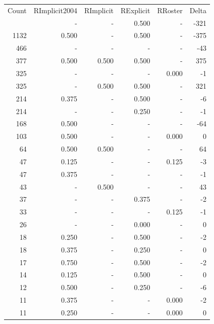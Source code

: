 \documentclass[a4paper]{article}\usepackage{graphicx, color}
\begin{document}
\begin{table}[ht]
\centering
\begin{tabular}{rrrrrr}
  \hline
Count & RImplicit2004 & RImplicit & RExplicit & RRoster & Delta \\ 
  \rowcolor{sosoColor}  \hline
1472 & - & - & 0.500 & - & -321 \\ 
   \rowcolor{sosoColor} 1132 & 0.500 & - & 0.500 & - & -375 \\ 
   \rowcolor{nullColor} 466 & - & - & - & - & -43 \\ 
   \rowcolor{goodColor} 377 & 0.500 & 0.500 & 0.500 & - & 375 \\ 
   \rowcolor{nullColor} 325 & - & - & - & 0.000 & -1 \\ 
   \rowcolor{goodColor} 325 & - & 0.500 & 0.500 & - & 321 \\ 
   \rowcolor{sosoColor} 214 & 0.375 & - & 0.500 & - & -6 \\ 
   \rowcolor{sosoColor} 214 & - & - & 0.250 & - & -1 \\ 
   \rowcolor{nullColor} 168 & 0.500 & - & - & - & -64 \\ 
   \rowcolor{nullColor} 103 & 0.500 & - & - & 0.000 & 0 \\ 
  64 & 0.500 & 0.500 & - & - & 64 \\ 
   \rowcolor{nullColor} 47 & 0.125 & - & - & 0.125 & -3 \\ 
   \rowcolor{nullColor} 47 & 0.375 & - & - & - & -1 \\ 
  43 & - & 0.500 & - & - & 43 \\ 
   \rowcolor{sosoColor} 37 & - & - & 0.375 & - & -2 \\ 
   \rowcolor{nullColor} 33 & - & - & - & 0.125 & -1 \\ 
   \rowcolor{sosoColor} 26 & - & - & 0.000 & - & 0 \\ 
   \rowcolor{sosoColor} 18 & 0.250 & - & 0.500 & - & -2 \\ 
   \rowcolor{sosoColor} 18 & 0.375 & - & 0.250 & - & 0 \\ 
   \rowcolor{sosoColor} 17 & 0.750 & - & 0.500 & - & -2 \\ 
   \rowcolor{sosoColor} 14 & 0.125 & - & 0.500 & - & 0 \\ 
   \rowcolor{sosoColor} 12 & 0.500 & - & 0.250 & - & -6 \\ 
   \rowcolor{nullColor} 11 & 0.375 & - & - & 0.000 & -2 \\ 
   \rowcolor{nullColor} 11 & 0.250 & - & - & 0.000 & 0 \\ 

\end{tabular}
\end{table}
\end{document}
